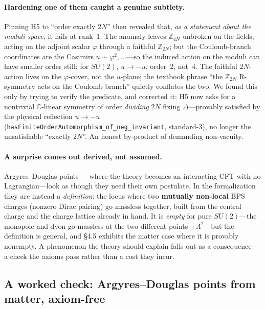 \documentclass{article}
\theoremstyle{plain}
\theoremstyle{definition}
\numberwithin{equation}{section}
\newcommand{\code}[1]{\texttt{#1}}
\begin{document}
\paragraph{Hardening one of them caught a genuine subtlety.} Pinning H5 to ``order exactly $2N$''
then revealed that, \emph{as a statement about the moduli space}, it fails at rank~1. The
anomaly leaves $\mathbb{Z}_{4N}$ unbroken on the fields, acting on the adjoint scalar $\varphi$
through a faithful $\mathbb{Z}_{2N}$; but the Coulomb-branch coordinates are the Casimirs
$u \sim \varphi^2,\dots$---so the induced action on the moduli can have smaller order still: for
$SU(2)$, $u \to -u$, order~2, not~4. The faithful $2N$-action lives on
the $\varphi$-cover, not the $u$-plane; the textbook phrase ``the $\mathbb{Z}_{2N}$ R-symmetry acts
on the Coulomb branch'' quietly conflates the two. We found this only by trying to verify the
predicate, and corrected it: H5 now asks for a nontrivial $\mathbb{C}$-linear symmetry of order
\emph{dividing} $2N$ fixing $\Delta$---provably satisfied by the physical reflection $u \to -u$
(\code{hasFiniteOrderAutomorphism\_of\_neg\_invariant}, standard-3), no longer the unsatisfiable
``exactly $2N$''. An honest by-product of demanding non-vacuity.

\paragraph{A surprise comes out derived, not assumed.} Argyres--Douglas
points~\cite{ArgyresDouglas1995}---where the theory
becomes an interacting CFT with no Lagrangian---look as though they need their own postulate. In the
formalization they are instead a \emph{definition}: the locus where two \textbf{mutually non-local}
BPS charges (nonzero Dirac pairing) go massless together, built from the central charge and the
charge lattice already in hand. It is \emph{empty} for pure $SU(2)$---the monopole and dyon go
massless at the two different points $\pm\Lambda^2$---but the definition is general, and \S4.5
exhibits the matter case where it is provably nonempty. A phenomenon the theory should explain falls
out as a consequence---a check the axioms pass rather than a cost they incur.

\subsection{A worked check: Argyres--Douglas points from matter, axiom-free}
\end{document}
